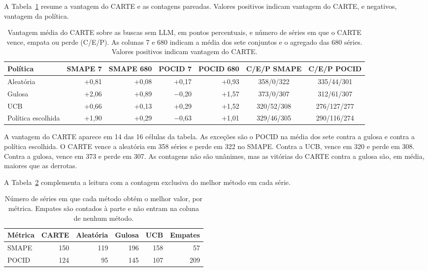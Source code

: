 A Tabela~\ref{tab:ablacao-buscas-vantagem} resume a vantagem do CARTE e as contagens pareadas. Valores positivos indicam vantagem do CARTE, e negativos, vantagem da política.

\begin{table}[H]
\centering
\small
\setlength{\tabcolsep}{4pt}
\caption[Vantagem do CARTE sobre as buscas sem LLM.]{Vantagem média do CARTE sobre as buscas sem LLM, em pontos percentuais, e número de séries em que o CARTE vence, empata ou perde (C/E/P). As colunas 7 e 680 indicam a média dos sete conjuntos e o agregado das 680 séries. Valores positivos indicam vantagem do CARTE.}
\label{tab:ablacao-buscas-vantagem}
\begin{tabular}{@{}lrrrrcc@{}}
\toprule
\textbf{Política} & \textbf{SMAPE 7} & \textbf{SMAPE 680} & \textbf{POCID 7} & \textbf{POCID 680} & \textbf{C/E/P SMAPE} & \textbf{C/E/P POCID} \\
\midrule
Aleatória    & +0,81 & +0,08 & +0,17 & +0,93 & 358/0/322 & 335/44/301 \\
Gulosa       & +2,06 & +0,89 & $-$0,20 & +1,57 & 373/0/307 & 312/61/307 \\
UCB          & +0,66 & +0,13 & +0,29 & +1,52 & 320/52/308 & 276/127/277 \\
Política escolhida & +1,90 & +0,29 & $-$0,63 & +1,01 & 329/46/305 & 290/116/274 \\
\bottomrule
\end{tabular}
\end{table}

A vantagem do CARTE aparece em 14 das 16 células da tabela. As exceções são o POCID na média dos sete contra a gulosa e contra a política escolhida. O CARTE vence a aleatória em 358 séries e perde em 322 no SMAPE. Contra a UCB, vence em 320 e perde em 308. Contra a gulosa, vence em 373 e perde em 307. As contagens não são unânimes, mas as vitórias do CARTE contra a gulosa são, em média, maiores que as derrotas.

A Tabela~\ref{tab:ablacao-buscas-vitorias} complementa a leitura com a contagem exclusiva do melhor método em cada série.

\begin{table}[H]
\centering
\small
\caption[Séries com o melhor valor, por método.]{Número de séries em que cada método obtém o melhor valor, por métrica. Empates são contados à parte e não entram na coluna de nenhum método.}
\label{tab:ablacao-buscas-vitorias}
\begin{tabular}{@{}lrrrrr@{}}
\toprule
\textbf{Métrica} & \textbf{CARTE} & \textbf{Aleatória} & \textbf{Gulosa} & \textbf{UCB} & \textbf{Empates} \\
\midrule
SMAPE & 150 & 119 & 196 & 158 & 57 \\
POCID & 124 & 95 & 145 & 107 & 209 \\
\bottomrule
\end{tabular}
\end{table}

